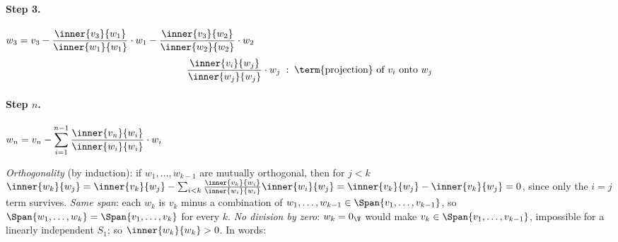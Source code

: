\paragraph{Step 3.} $\displaystyle w_3 = v_3 - \frac{\inner{v_3}{w_1}}{\inner{w_1}{w_1}}\cdot w_1 - \frac{\inner{v_3}{w_2}}{\inner{w_2}{w_2}}\cdot w_2$
\[
\frac{\inner{v_i}{w_j}}{\inner{w_j}{w_j}}\cdot w_j \;:\; \text{\term{projection} of } v_i \text{ onto } w_j
\]

\paragraph{Step $n$.} $\displaystyle w_n = v_n - \sum_{i=1}^{n-1}\frac{\inner{v_n}{w_i}}{\inner{w_i}{w_i}}\cdot w_i$
\begin{insight}
\emph{Orthogonality} (by induction): if $w_1,\ldots,w_{k-1}$ are mutually orthogonal, then for $j<k$
$\inner{w_k}{w_j} = \inner{v_k}{w_j} - \sum_{i<k}\frac{\inner{v_k}{w_i}}{\inner{w_i}{w_i}}\inner{w_i}{w_j} = \inner{v_k}{w_j} - \inner{v_k}{w_j} = 0$,
since only the $i=j$ term survives.
\emph{Same span}: each $w_k$ is $v_k$ minus a combination of $w_1,\ldots,w_{k-1}\in\Span\{v_1,\ldots,v_{k-1}\}$, so $\Span\{w_1,\ldots,w_k\} = \Span\{v_1,\ldots,v_k\}$ for every $k$.
\emph{No division by zero}: $w_k = 0_\V$ would make $v_k\in\Span\{v_1,\ldots,v_{k-1}\}$, impossible for a linearly independent $S_1$; so $\inner{w_k}{w_k}>0$.
In words: 
\end{insight}

